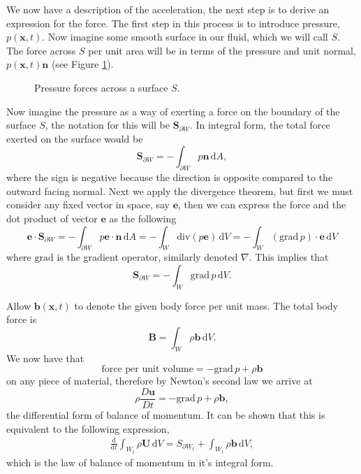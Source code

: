\documentclass[undefended]{sfuthesis}
\begin{document}
We now have a description of the acceleration, the next step is to derive an expression for the force. The first step in this process is to introduce pressure, $p(\textbf{x}, t)$. Now imagine some smooth surface in our fluid, which we will call $S$. The force across $S$ per unit area will be in terms of the pressure and unit normal, $p(\textbf{x}, t) \textbf{n}$ (see Figure \ref{fig:pressure}).
\begin{figure}[h!]
\centering
{}
\caption{Pressure forces across a surface $S$.}
\label{fig:pressure}
\end{figure}

Now imagine the pressure as a way of exerting a force on the boundary of the surface $S$, the notation for this will be $\textbf{S}_{\partial W}.$ In integral form, the total force exerted on the surface would be \[\textbf{S}_{\partial W} = - \int_{\partial W} p \textbf{n} \,\mathrm{d} A,\] where the sign is negative because the direction is opposite compared to the outward facing normal. Next we apply the divergence theorem, but first we must consider any fixed vector in space, say $\textbf{e}$, then we can express the force and the dot product of vector $\textbf{e}$ as the following \[\textbf{e} \cdot \textbf{S}_{\partial W} = - \int_{\partial W} p \textbf{e} \cdot \textbf{n} \,\mathrm{d} A = - \int_W \mathrm{div}(p \textbf{e}) \,\mathrm{d} V = - \int_W (\mathrm{grad} \,p) \cdot \textbf{e} \,\mathrm{d} V\] where $\mathrm{grad}$ is the gradient operator, similarly denoted $\nabla$. This implies that \[\textbf{S}_{\partial W} = - \int_W \mathrm{grad} \,p \,\mathrm{d} V.\]

Allow $\textbf{b}(\textbf{x}, t)$ to denote the given body force per unit mass. The total body force is \[\textbf{B} = \int_W \rho \textbf{b} \,\mathrm{d}V.\] We now have that \[\text{force per unit volume} = - \mathrm{grad} \,p + \rho \textbf{b}\] on any piece of material, therefore by Newton's second law we arrive at \[\rho \frac{D \textbf{u}}{Dt} = - \mathrm{grad} \,p + \rho \textbf{b},\] the differential form of balance of momentum. It can be shown that this is equivalent to the following expression,
\begin{align}
\frac{\mathrm{d}}{\mathrm{d} t} \int_{W_t} \rho \textbf{U} \,\mathrm{d} V = S_{\partial W_t} + \int_{W_t} \rho \textbf{b} \,\mathrm{d} V,\label{balanceMomentumEq} 
\end{align}
which is the law of balance of momentum in it's integral form.
\end{document}
